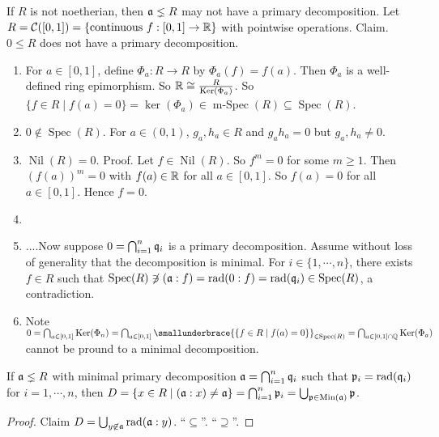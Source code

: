 \begin{example}
    If $R$ is not noetherian, then $\mathfrak{a} \lneq R$ may not have a primary decomposition. Let $R = \mathcal{C}([0,1]) = \{\text{continuous }f: [0,1] \to \mathbb{R}\}$ with pointwise operations. Claim. $0 \leq R$ does not have a primary decomposition.
    \begin{enumerate}
        \item For $a \in [0,1]$, define $\Phi_a: R \to R$ by $\Phi_a(f) = f(a)$. Then $\Phi_a$ is a well-defined ring epimorphism. So $\mathbb{R} \cong \frac{R}{\operatorname{Ker}(\Phi_a)}$. So $\{f \in R \mid f(a) = 0\} = \ker(\Phi_a) \in \operatorname{m-Spec}(R) \subseteq \operatorname{Spec}(R)$.
        \item $0 \not \in \operatorname{Spec}(R)$. For $a \in (0,1)$, $g_a,h_a \in R$ and $g_ah_a = 0$ but $g_a,h_a \neq 0$.
        \item $\operatorname{Nil}(R) = 0$. Proof. Let $f \in \operatorname{Nil}(R)$. So $f^{m} = 0$ for some $m \geq 1$. Then $(f(a))^{m} = 0$ with $f(a) \in \mathbb{R}$ for all $a \in [0,1]$. So $f(a) = 0$ for all $a \in [0,1]$. Hence $f= 0$.
        \item 
        \item
            ....Now suppose $0 = \bigcap_{i=1}^{n}\mathfrak{q}_i$ is a primary decomposition. Assume without loss of generality that the decomposition is minimal. For $i \in \{1,\cdots,n\}$, there exists $f \in R$ such that $\operatorname{Spec}(R) \not \ni (\mathfrak{a}:f) = \operatorname{rad}(0:f) = \operatorname{rad}(\mathfrak{q}_i) \in \operatorname{Spec}(R)$, a contradiction. 
        \item Note $0 = \bigcap_{a \in [0,1]} \ker(\Phi_n) = \bigcap_{a \in [0,1]} \smallunderbrace{\{f \in R \mid f(a) = 0\}}_{\in \operatorname{Spec}(R)} = \bigcap_{a \in [0,1] \cap \bbQ} \ker(\Phi_a)$ cannot be pround to a minimal decomposition.
    \end{enumerate}
\end{example}

\begin{proposition}
    If $\mathfrak{a} \lneq R$ with minimal primary decomposition $\mathfrak{a} = \bigcap_{i=1}^{n} \mathfrak{q}_i$ such that $\mathfrak{p}_i = \operatorname{rad}(\mathfrak{q}_i)$ for $i = 1,\cdots,n$, then $D = \{x \in R \mid (\mathfrak{a}:x) \neq \mathfrak{a}\} = \bigcap_{i=1}^{n} \mathfrak{p}_i = \bigcup_{\mathfrak{p} \in \operatorname{Min}(\mathfrak{a})} \mathfrak{p}$.
\end{proposition}

\begin{proof}
    Claim $D = \bigcup_{y \not\in \mathfrak{a}} \operatorname{rad}(\mathfrak{a}:y)$. ``$\subseteq$''. ``$\supseteq$''.
\end{proof}

